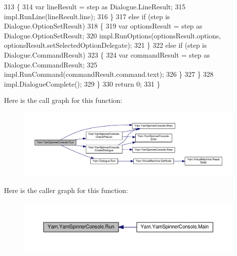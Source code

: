 \begin{DoxyCode}
313                     \{
314                         var lineResult = step as Dialogue.LineResult;
315                         impl.RunLine(lineResult.line);
316                     \}
317                     \textcolor{keywordflow}{else} \textcolor{keywordflow}{if} (step is Dialogue.OptionSetResult)
318                     \{
319                         var optionsResult = step as Dialogue.OptionSetResult;
320                         impl.RunOptions(optionsResult.options, optionsResult.setSelectedOptionDelegate);
321                     \}
322                     \textcolor{keywordflow}{else} \textcolor{keywordflow}{if} (step is Dialogue.CommandResult)
323                     \{
324                         var commandResult = step as Dialogue.CommandResult;
325                         impl.RunCommand(commandResult.command.text);
326                     \}
327                 \}
328                 impl.DialogueComplete();
329             \}
330             \textcolor{keywordflow}{return} 0;
331         \}
\end{DoxyCode}


Here is the call graph for this function\-:
\nopagebreak
\begin{figure}[H]
\begin{center}
\leavevmode
\includegraphics[width=350pt]{a00174_a1b974c55540795a9e643c2ec055fbd51_cgraph}
\end{center}
\end{figure}




Here is the caller graph for this function\-:
\nopagebreak
\begin{figure}[H]
\begin{center}
\leavevmode
\includegraphics[width=350pt]{a00174_a1b974c55540795a9e643c2ec055fbd51_icgraph}
\end{center}
\end{figure}


